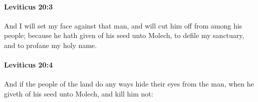		\paragraph{Leviticus 20:3} %
			\label{LEVITICUS-20-3}

			And I will set my face against that man, and will cut him off from among his people; because he hath given of his seed unto Molech, to defile my sanctuary, and to profane my holy name.


		\paragraph{Leviticus 20:4} %
			\label{LEVITICUS-20-4}

			And if the people of the land do any ways hide their eyes from the man, when he giveth of his seed unto Molech, and kill him not:


